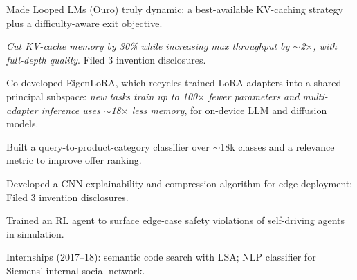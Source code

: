 \documentclass[10pt,letterpaper]{article}
\newenvironment{bullets}
  {\begin{list}{\color{muted}\textbullet}{\setlength{\leftmargin}{11pt}\setlength{\labelsep}{5pt}%
    \setlength{\itemsep}{1.5pt}\setlength{\parsep}{0pt}\setlength{\topsep}{2.5pt}\setlength{\partopsep}{0pt}}}
  {\end{list}\vspace{5pt}}
\begin{document}
\begin{bullets}
  \item Made Looped LMs (Ouro) truly dynamic: a best-available KV-caching strategy plus a difficulty-aware exit objective.
  \item \textit{Cut KV-cache memory by 30\% while increasing max throughput by $\sim$2$\times$, with full-depth quality}. Filed 3 invention disclosures.
\end{bullets}

\begin{bullets}
  \item Co-developed EigenLoRA, which recycles trained LoRA adapters into a shared principal subspace: \textit{new tasks train up to 100$\times$ fewer parameters and multi-adapter inference uses $\sim$18$\times$ less memory}, for on-device LLM and diffusion models.
\end{bullets}

\begin{bullets}
  \item Built a query-to-product-category classifier over $\sim$18k classes and a relevance metric to improve offer ranking.
\end{bullets}

\begin{bullets}
  \item Developed a CNN explainability and compression algorithm for edge deployment; Filed 3 invention disclosures.
  \item Trained an RL agent to surface edge-case safety violations of self-driving agents in simulation.
  \item Internships (2017--18): semantic code search with LSA; NLP classifier for Siemens' internal social network.
\end{bullets}
\end{document}
